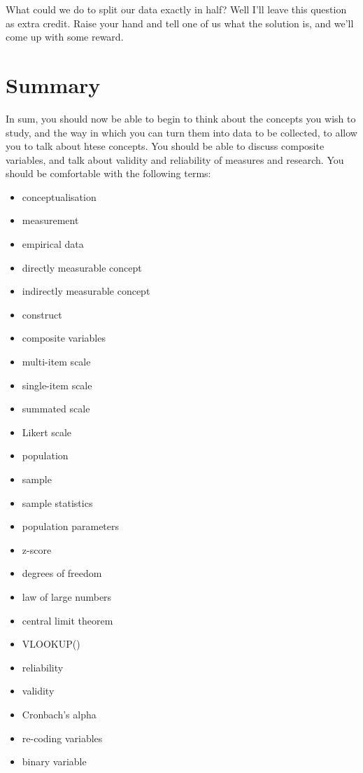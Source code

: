 \documentclass[]{book}
\providecommand{\tightlist}{%
  \setlength{\itemsep}{0pt}\setlength{\parskip}{0pt}}
\theoremstyle{definition}
\theoremstyle{definition}
\theoremstyle{definition}
\theoremstyle{remark}
\begin{document}
What could we do to split our data exactly in half? Well I'll leave this
question as extra credit. Raise your hand and tell one of us what the
solution is, and we'll come up with some reward.

\hypertarget{summary-3}{%
\section{Summary}\label{summary-3}}

In sum, you should now be able to begin to think about the concepts you
wish to study, and the way in which you can turn them into data to be
collected, to allow you to talk about htese concepts. You should be able
to discuss composite variables, and talk about validity and reliability
of measures and research. You should be comfortable with the following
terms:

\begin{itemize}
\tightlist
\item
  conceptualisation
\item
  measurement
\item
  empirical data
\item
  directly measurable concept
\item
  indirectly measurable concept
\item
  construct
\item
  composite variables
\item
  multi-item scale
\item
  single-item scale
\item
  summated scale
\item
  Likert scale
\item
  population
\item
  sample
\item
  sample statistics
\item
  population parameters
\item
  z-score
\item
  degrees of freedom
\item
  law of large numbers
\item
  central limit theorem
\item
  VLOOKUP()
\item
  reliability
\item
  validity
\item
  Cronbach's alpha
\item
  re-coding variables
\item
  binary variable
\end{itemize}
\end{document}
